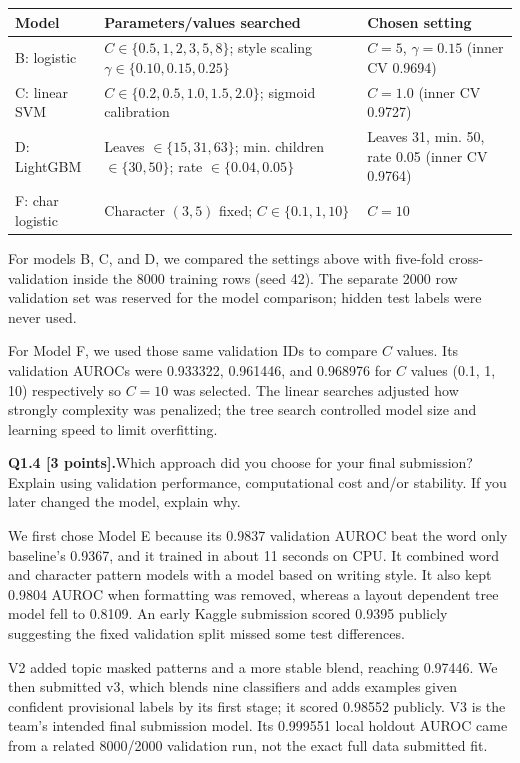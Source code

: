 \documentclass[11pt,letterpaper]{article}
\newcommand{\question}[2]{\needspace{4\baselineskip}\par\addvspace{0.45em}\noindent\textbf{#1}\quad #2\par\nobreak\vspace{0.1em}}
\begin{document}
\begin{tabularx}{\linewidth}{@{}p{1.18in}Yp{1.38in}@{}}\toprule Model & Parameters/values searched & Chosen setting \\ \midrule
B: logistic & $C\in\{0.5,1,2,3,5,8\}$; style scaling $\gamma\in\{0.10,0.15,0.25\}$ & $C=5$, $\gamma=0.15$ (inner CV 0.9694) \\
C: linear SVM & $C\in\{0.2,0.5,1.0,1.5,2.0\}$; sigmoid calibration & $C=1.0$ (inner CV 0.9727) \\
D: LightGBM & Leaves $\in\{15,31,63\}$; min. children $\in\{30,50\}$; rate $\in\{0.04,0.05\}$ & Leaves 31, min. 50, rate 0.05 (inner CV 0.9764) \\
F: char logistic & Character $(3,5)$ fixed; $C\in\{0.1,1,10\}$ & $C=10$ \\
\bottomrule\end{tabularx}
\newline

For models B, C, and D, we compared the settings above with five-fold cross-validation inside the 8000 training rows (seed 42). The separate 2000 row validation set was reserved for the model comparison; hidden test labels were never used.
\newline

For Model F, we used those same validation IDs to compare $C$ values. Its validation AUROCs were 0.933322, 0.961446, and 0.968976 for $C$ values (0.1, 1, 10) respectively so $C=10$ was selected. The linear searches adjusted how strongly complexity was penalized; the tree search controlled model size and learning speed to limit overfitting.
\question{Q1.4 [3 points].}{Which approach did you choose for your final submission? Explain using validation performance, computational cost and/or stability. If you later changed the model, explain why.}
We first chose Model E because its 0.9837 validation AUROC beat the word only baseline's 0.9367, and it trained in about 11 seconds on CPU. It combined word and character pattern models with a model based on writing style. It also kept 0.9804 AUROC when formatting was removed, whereas a layout dependent tree model fell to 0.8109. An early Kaggle submission scored 0.9395 publicly suggesting the fixed validation split missed some test differences.
\newline

V2 added topic masked patterns and a more stable blend, reaching 0.97446. We then submitted v3, which blends nine classifiers and adds examples given confident provisional labels by its first stage; it scored 0.98552 publicly. V3 is the team's intended final submission model. Its 0.999551 local holdout AUROC came from a related 8000/2000 validation run, not the exact full data submitted fit.
\end{document}
